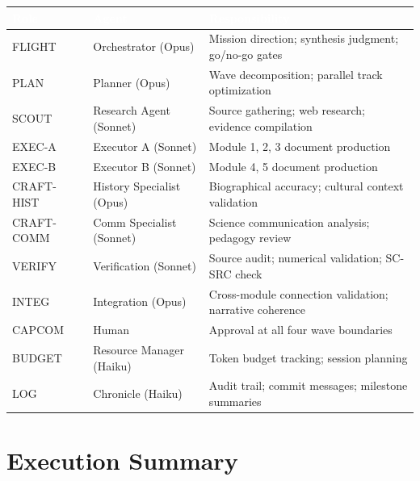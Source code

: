 \documentclass[11pt,letterpaper]{article}
\newcommand{\tableheader}[1]{\textbf{\sffamily\textcolor{white}{#1}}}
\begin{document}
\begin{center}
\begin{tabularx}{\textwidth}{L{2cm}L{3cm}X}
\toprule
{}
\tableheader{Role} & \tableheader{Agent} & \tableheader{Responsibility} \\
\midrule
FLIGHT & Orchestrator (Opus) & Mission direction; synthesis judgment; go/no-go gates \\
PLAN & Planner (Opus) & Wave decomposition; parallel track optimization \\
SCOUT & Research Agent (Sonnet) & Source gathering; web research; evidence compilation \\
EXEC-A & Executor A (Sonnet) & Module 1, 2, 3 document production \\
EXEC-B & Executor B (Sonnet) & Module 4, 5 document production \\
CRAFT-HIST & History Specialist (Opus) & Biographical accuracy; cultural context validation \\
CRAFT-COMM & Comm Specialist (Sonnet) & Science communication analysis; pedagogy review \\
VERIFY & Verification (Sonnet) & Source audit; numerical validation; SC-SRC check \\
INTEG & Integration (Opus) & Cross-module connection validation; narrative coherence \\
CAPCOM & Human & Approval at all four wave boundaries \\
BUDGET & Resource Manager (Haiku) & Token budget tracking; session planning \\
LOG & Chronicle (Haiku) & Audit trail; commit messages; milestone summaries \\
\bottomrule
\end{tabularx}
\end{center}

\section{Execution Summary}
\end{document}
